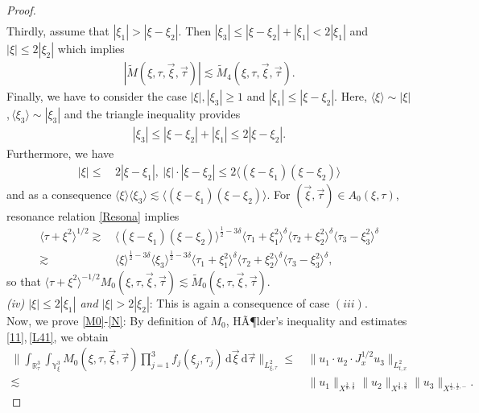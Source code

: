 \documentclass[reqno]{amsart}
\theoremstyle{Definitionl}
\theoremstyle{Definitionk}
\theoremstyle{definition}
\theoremstyle{Satzk}
\theoremstyle{Satzl}
\theoremstyle{Bemerkung}
\begin{document}
\begin{proof}
\begin{align*}
\end{align*}
Thirdly, assume that $|\xi_1|>|\xi-\xi_2|$. Then $|\xi_3|\le |\xi-\xi_2|+|\xi_1|<2|\xi_1|$ and $|\xi|\le 2|\xi_2|$ which implies
\begin{align*}
|\tilde M(\xi,\tau,\vec\xi,\vec\tau)|\lesssim \tilde M_4(\xi,\tau,\vec\xi,\vec\tau).
\end{align*}
Finally, we have to consider the case $|\xi|,|\xi_3|\ge1$ and $|\xi_1|\le|\xi-\xi_2|$. Here, $\langle\xi\rangle\sim|\xi|$,\,$\langle\xi_3\rangle\sim|\xi_3|$ and the triangle inequality provides
\begin{align*}
|\xi_3|\le |\xi-\xi_2|+|\xi_1|\le 2|\xi-\xi_2|.
\end{align*}
Furthermore, we have
\begin{align*}
|\xi|\le&\, 2|\xi-\xi_1|,\ 
|\xi|\cdot|\xi-\xi_2|\le 2\langle(\xi-\xi_1)(\xi-\xi_2)\rangle
\end{align*}
and as a consequence $
\langle\xi\rangle\langle\xi_3\rangle\lesssim\langle(\xi-\xi_1)(\xi-\xi_2)\rangle$. 
For $(\vec\xi,\vec\tau)\in A_0(\xi,\tau)$, resonance relation \eqref{Resona} implies
\begin{align*}
\langle\tau+\xi^2\rangle^{1/2}
\gtrsim&\,\langle(\xi-\xi_1)(\xi-\xi_2)\rangle^{\frac12-3\delta}\langle\tau_1+\xi_1^2\rangle^{\delta}\langle\tau_2+\xi_2^2\rangle^{\delta}\langle\tau_3-\xi_3^2\rangle^{\delta}\\
\gtrsim&\, \langle\xi\rangle^{\frac12-3\delta}\langle\xi_3\rangle^{\frac12-3\delta}\langle\tau_1+\xi_1^2\rangle^{\delta}\langle\tau_2+\xi_2^2\rangle^{\delta}\langle\tau_3-\xi_3^2\rangle^{\delta},
\end{align*}
so that $\langle\tau+\xi^2\rangle^{-1/2}M_0(\xi,\tau,\vec\xi,\vec\tau)\lesssim \tilde M_0(\xi,\tau,\vec\xi,\vec\tau)$.\\[10pt]
\emph{(iv) $|\xi|\le2|\xi_1|$ and $|\xi|>2|\xi_2|$}: This is again a consequence of case $(iii)$.\\[10pt]
Now, we prove \eqref{M0}-\eqref{N}: By definition of $M_0$, HÃ¶lder's inequality and estimates \eqref{11},\,\eqref{L41}, we obtain
\begin{align*}
\Big\|\int_{\mathbb R^3_\tau}\int_{\mathbb Y^3_\xi}M_0(\xi,\tau,\vec\xi,\vec\tau)\prod_{j=1}^3f_j(\xi_j,\tau_j)\,\mathrm d\vec\xi\,\mathrm d\vec\tau\Big\|_{L^2_{\xi,\tau}}\le&\, \|u_1\cdot u_2\cdot J_x^{1/2}u_3\|_{L^2_{t,x}}\\
\lesssim&\, \|u_1\|_{X^{\frac38,\frac38}}\|u_2\|_{X^{\frac38,\frac38}}\|u_3\|_{X^{\frac12,\frac12,-}}.
\end{align*}

\end{proof}
\end{document}

